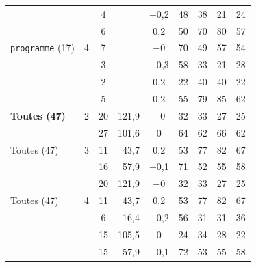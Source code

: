 {\begin{tabular}{lccrccccc}
 \\
 &  & 4 &  & $-$0,2\hspace{1em} & 48 & 38 & 21 & 24
 \\
 &  & 6 &  & 0,2\hspace{1em} & 50 & 70 & 80 & 57
 \\
\midrule
\texttt{programme} (17) & 4 & 7 &  & $-$0\hspace{1em} & 70 & 49 & 57 & 54
 \\
 &  & 3 &  & $-$0,3\hspace{1em} & 58 & 33 & 21 & 28
 \\
 &  & 2 &  & 0,2\hspace{1em} & 22 & 40 & 40 & 22
 \\
 &  & 5 &  & 0,2\hspace{1em} & 55 & 79 & 85 & 62
 \\
\midrule
{\bfseries Toutes (47)} & 2 & 20 & 121,9 & $-$0\hspace{1em} & 32 & 33 & 27 & 25
 \\
 &  & 27 & 101,6 & 0\hspace{1em} & 64 & 62 & 66 & 62
 \\
\midrule
Toutes (47) & 3 & 11 & 43,7 & 0,2\hspace{1em} & 53 & 77 & 82 & 67
 \\
 &  & 16 & 57,9 & $-$0,1\hspace{1em} & 71 & 52 & 55 & 58
 \\
 &  & 20 & 121,9 & $-$0\hspace{1em} & 32 & 33 & 27 & 25
 \\
\midrule
Toutes (47) & 4 & 11 & 43,7 & 0,2\hspace{1em} & 53 & 77 & 82 & 67
 \\
 &  & 6 & 16,4 & $-$0,2\hspace{1em} & 56 & 31 & 31 & 36
 \\
 &  & 15 & 105,5 & 0\hspace{1em} & 24 & 34 & 28 & 22
 \\
 &  & 15 & 57,9 & $-$0,1\hspace{1em} & 72 & 53 & 55 & 58
 \\
\bottomrule
\end{tabular}}
